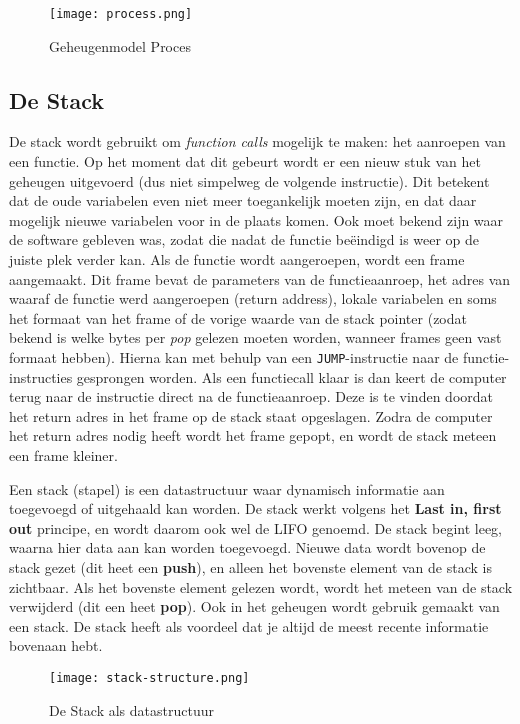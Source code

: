 \begin{figure}[ht]
    \centering
    \texttt{[image: process.png]}
    \caption{Geheugenmodel Proces}
    \label{fig:process-memory}
\end{figure}

\subsection{De Stack}
De stack wordt gebruikt om \emph{function calls} mogelijk te maken: het aanroepen van een functie. Op het moment dat dit gebeurt wordt er een nieuw stuk van het geheugen uitgevoerd (dus niet simpelweg de volgende instructie). Dit betekent dat de oude variabelen even niet meer toegankelijk moeten zijn, en dat daar mogelijk nieuwe variabelen voor in de plaats komen. Ook moet bekend zijn waar de software gebleven was, zodat die nadat de functie beëindigd is weer op de juiste plek verder kan. Als de functie wordt aangeroepen, wordt een frame aangemaakt. Dit frame bevat de parameters van de functieaanroep, het adres van waaraf de functie werd aangeroepen (return address), lokale variabelen en soms het formaat van het frame of de vorige waarde van de stack pointer (zodat bekend is welke bytes per \emph{pop} gelezen moeten worden, wanneer frames geen vast formaat hebben). Hierna kan met behulp van een \texttt{JUMP}-instructie naar de functie-instructies gesprongen worden. Als een functiecall klaar is dan keert de computer terug naar de instructie direct na de functieaanroep. Deze is te vinden doordat het return adres in het frame op de stack staat opgeslagen. Zodra de computer het return adres nodig heeft wordt het frame gepopt, en wordt de stack meteen een frame kleiner.

\begin{aside}[De Stack]\label{de-stack}
Een stack (stapel) is een datastructuur waar dynamisch informatie aan toegevoegd of uitgehaald kan worden. De stack werkt volgens het \textbf{Last in, first out} principe, en wordt daarom ook wel de LIFO genoemd. De stack begint leeg, waarna hier data aan kan worden toegevoegd. Nieuwe data wordt bovenop de stack gezet (dit heet een \textbf{push}), en alleen het bovenste element van de stack is zichtbaar. Als het bovenste element gelezen wordt, wordt het meteen van de stack verwijderd (dit een heet \textbf{pop}). Ook in het geheugen wordt gebruik gemaakt van een stack. De stack heeft als voordeel dat je altijd de meest recente informatie bovenaan hebt.\\[3mm]
\begin{figure}[ht]
    \centering
    \texttt{[image: stack-structure.png]}
    \caption{De Stack als datastructuur}
    \label{fig:stack}
\end{figure}
\end{aside}


